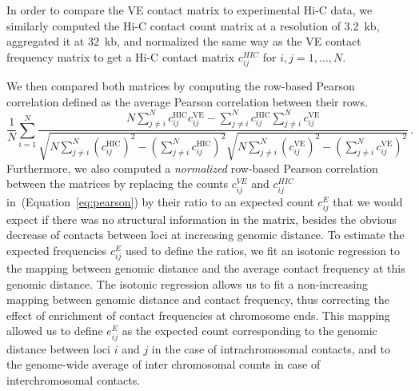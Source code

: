 In order to compare the VE contact matrix to experimental Hi-C data,
we similarly computed the Hi-C contact count matrix at a resolution of
3.2~kb, aggregated it at 32~kb, and normalized the same way as the VE
contact frequency matrix to get a Hi-C contact matrix
$c_{ij}^{HIC}$ for $i,j=1,\ldots,N$.

We then compared both matrices by computing the row-based Pearson correlation
\citep{tjong:physical} defined as the average Pearson correlation between their rows.
\begin{equation}\label{eq:pearson}
\frac{1}{N} \sum_{i=1}^{N} \frac{
  N \sum_{j \neq i}^N c_{ij}^{\text{HIC}}{c}_{ij}^{\text{VE}} -
  \sum_{j \neq i}^N {c}_{ij}^{\text{HIC}} \sum_{j \neq i}^N {c}_{ij}^{\text{VE}}
}{
\sqrt{N \sum_{j \neq i }^N({c}_{ij}^{\text{HIC}})^2 - (\sum_{j \neq i}^N
{c}_{ij}^{\text{HIC}})^2}
\sqrt{N \sum_{j \neq i }^N({c}_{ij}^{\text{VE}})^2 - (\sum_{j \neq i}^N
{c}_{ij}^{\text{VE}})^2}}\,.
\end{equation}
Furthermore, we also computed a \emph{normalized} row-based Pearson correlation
between the matrices by replacing the counts $c^{VE}_{ij}$ and $c^{HIC}_{ij}$
in~(Equation~\ref{eq:pearson}) by their ratio to an expected count $c^E_{ij}$ that we
would expect if there was no structural information in the matrix, besides
the obvious decrease of contacts between loci at increasing genomic
distance. To estimate the
expected frequencies $c^E_{ij}$ used to define the ratios, we fit an
isotonic regression to the mapping between genomic distance and the average
contact frequency at this genomic distance. The isotonic regression
allows us
to fit a non-increasing mapping between genomic distance and contact
frequency, thus correcting the effect of enrichment of contact frequencies
at chromosome ends. This mapping allowed us to define $e_{ij}^E$ as the expected
count corresponding to the genomic distance between loci $i$ and $j$ in the
case of intrachromosomal contacts, and to the genome-wide average of
inter chromosomal counts in case of interchromosomal contacts.






